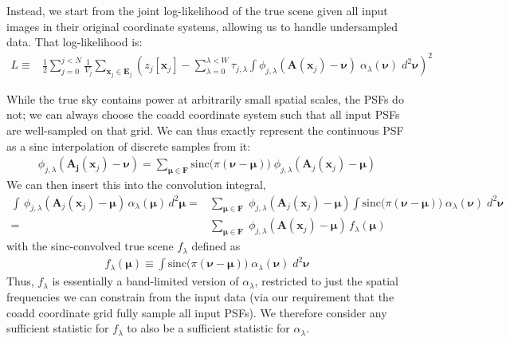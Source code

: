 \documentclass[DM,authoryear,toc]{lsstdoc}
\begin{document}
Instead, we start from the joint log-likelihood of the true scene given all input images in their original coordinate systems, allowing us to handle undersampled data.
That log-likelihood is:
\begin{align}
L \equiv &
    \frac{1}{2} \sum_{j=0}^{j<N}
        \frac{1}{V_j}
        \sum_{\bm{x}_j \in \bm{E}_j}
        \left(
            z_j[\bm{x}_j]
            - \sum_{\lambda=0}^{\lambda < W}
                \tau_{j,\lambda}
                \int\!
                \phi_{j,\lambda}\!\left(
                    \bm{A}(\bm{x}_j) - \bm{\nu}
                \right)
                \; \alpha_{\lambda}(\bm{\nu})
                \; d^2\bm{\nu}
        \right)^2
\end{align}

While the true sky contains power at arbitrarily small spatial scales, the PSFs do not; we can always choose the coadd coordinate system such that all
input PSFs are well-sampled on that grid.
We can thus exactly represent the continuous PSF as a sinc interpolation of
discrete samples from it:
\begin{align}
    \phi_{j,\lambda}\!\left(\bm{A_j}(\bm{x}_j)-\bm{\nu}\right) =
    \sum_{\bm{\mu} \in \bm{F}}
        \mathrm{sinc}\big(\pi(\bm{\nu}-\bm{\mu})\big)
        \;\phi_{j,\lambda}\!\left(
            \bm{A}_j(\bm{x}_j) - \bm{\mu}
        \right)
\end{align}
We can then insert this into the convolution integral,
\begin{align}
    \int\!
        \, \phi_{j,\lambda}\!\left(\bm{A}_j(\bm{x}_j)-\bm{\mu}\right)
        \, \alpha_{\lambda}(\bm{\mu})
        \, d^2\bm{\mu}
    = &
    \sum_{\bm{\mu} \in \bm{F}}
        \;\phi_{j,\lambda}\!\left(
            \bm{A}_j(\bm{x}_j) - \bm{\mu}
        \right)
        \!\int\!
        \mathrm{sinc}\big(\pi(\bm{\nu}-\bm{\mu})\big)
        \; \alpha_{\lambda}(\bm{\nu})
        \; d^2\bm{\nu} \\
    = &
    \sum_{\bm{\mu} \in \bm{F}}
        \;\phi_{j,\lambda}\!\left(
            \bm{A}(\bm{x}_j) - \bm{\mu}
        \right)
        \, f_{\lambda}(\bm{\mu})
\end{align}
with the sinc-convolved true scene $f_{\lambda}$ defined as
\begin{align}
    f_{\lambda}(\bm{\mu}) \equiv \int\!
        \mathrm{sinc}\big(\pi(\bm{\nu}-\bm{\mu})\big)
        \; \alpha_{\lambda}(\bm{\nu})
        \; d^2\bm{\nu}
\end{align}
Thus, $f_{\lambda}$ is essentially a band-limited version of $\alpha_{\lambda}$, restricted to just the spatial frequencies we can constrain from the input data (via our requirement that the coadd coordinate grid fully sample all input PSFs).
We therefore consider any sufficient statistic for $f_{\lambda}$ to also be a sufficient statistic for $\alpha_{\lambda}$.
\end{document}

